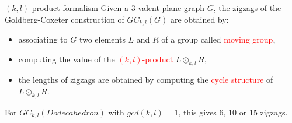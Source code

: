 \documentclass[%
pdf,
colorBG,
slideColor,
]{prosper}
\begin{document}
\begin{slide}{$(k,l)$-product formalism}
Given a $3$-valent plane graph $G$, the zigzags of the Goldberg-Coxeter construction of $GC_{k,l}(G)$ are obtained by:

\begin{itemize}
\item associating to $G$ two elements $L$ and $R$ of a group called \textcolor{red}{moving group},
\item computing the value of the \textcolor{red}{$(k,l)$-product} $L\odot_{k,l} R$,
\item the lengths of zigzags are obtained by computing the \textcolor{red}{cycle structure} of $L\odot_{k,l} R$.
\end{itemize}
For $GC_{k,l}(Dodecahedron)$ with $gcd(k,l)=1$, this gives $6$, $10$ or $15$ zigzags.


%


\end{slide}
\end{document}
